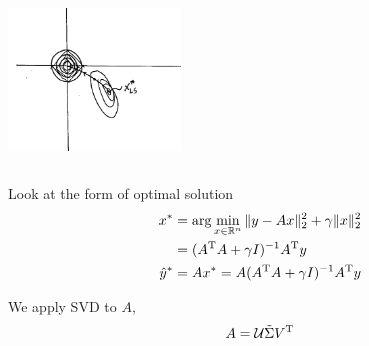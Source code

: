 \begin{marginfigure}
	\centering
	\includegraphics[width=1.8in,height=1.8in]{figures/ch06/figure4.png}
\end{marginfigure}

Look at the form of optimal solution 
\begin{align*}
x^* 
&= \arg\min_{x\in \mathbb{R}^n}\Vert y-Ax\Vert_2^2 + \gamma\Vert x\Vert^2_2\\
&= (A^{{\rm T}}A + \gamma I)^{-1}A^{{\rm T}}y\\
\hat{y}^*&= Ax^* = A(A^{{\rm T}}A + \gamma I)^{-1}A^{{\rm T}}y\\
\end{align*}

We apply SVD to $A$,
$$A = \mathcal{U}\tilde{\Sigma}V^{{\rm T}}$$

